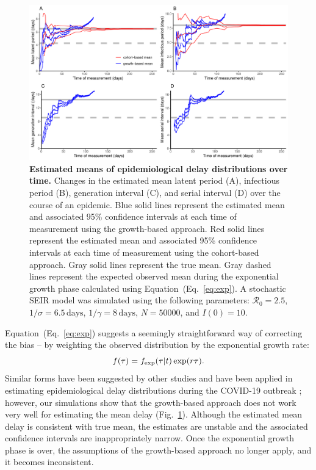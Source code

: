 \documentclass[12pt]{article}
\newcommand{\eref}[1]{(Eq.~\ref{eq:#1})}
\newcommand{\fref}[1]{Fig.~\ref{fig:#1}}
\begin{document}
\begin{figure}[!th]
\includegraphics[width=\textwidth]{figure_seir2.pdf}
\caption{
\textbf{Estimated means of epidemiological delay distributions over time.}
Changes in the estimated mean latent period (A), infectious period (B), generation interval (C), and serial interval (D) over the course of an epidemic.
Blue solid lines represent the estimated mean and associated 95\% confidence intervals at each time of measurement using the growth-based approach.
Red solid lines represent the estimated mean and associated 95\% confidence intervals at each time of measurement using the cohort-based approach.
Gray solid lines represent the true mean.
Gray dashed lines represent the expected observed mean during the exponential growth phase calculated using Equation~\eref{exp}.
A stochastic SEIR model was simulated using the following parameters: $\mathcal R_0 = 2.5$, $1/\sigma = 6.5\,\textrm{days}$, $1/\gamma = 8\,\textrm{days}$, $N=50000$, and $I(0)=10$.
}
\label{fig:seir2}
\end{figure}

Equation~\eref{exp} suggests a seemingly straightforward way of correcting the bias -- by weighting the observed distribution by the exponential growth rate:
\begin{equation}
\label{eq:exp}
f(\tau) = f_{\tiny\textrm{exp}}(\tau|t) \exp(r \tau).
\end{equation}
Similar forms have been suggested by other studies \citep{britton2019estimation, park2019inferring} and have been applied in estimating epidemiological delay distributions during the COVID-19 outbreak \citep{nishiura2020serial, linton2020incubation};
however, our simulations show that the growth-based approach does not work very well for estimating the mean delay (\fref{seir2}).
Although the estimated mean delay is consistent with true mean, the estimates are unstable and the associated confidence intervals are inappropriately narrow.
Once the exponential growth phase is over, the assumptions of the growth-based approach no longer apply, and it becomes inconsistent.
\end{document}
